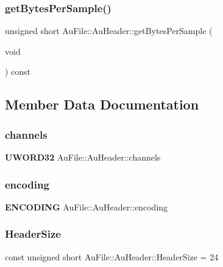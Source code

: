 \subsubsection{get\+Bytes\+Per\+Sample()}
{\footnotesize\ttfamily unsigned short Au\+File\+::\+Au\+Header\+::get\+Bytes\+Per\+Sample (\begin{DoxyParamCaption}\item[{void}]{ }\end{DoxyParamCaption}) const}



\subsection{Member Data Documentation}
\mbox{\label{classAuFile_1_1AuHeader_a6b283f9b7d02ef0def4edc67f359d646}} 
\subsubsection{channels}
{\footnotesize\ttfamily \textbf{ U\+W\+O\+R\+D32} Au\+File\+::\+Au\+Header\+::channels}

\mbox{\label{classAuFile_1_1AuHeader_a463aaa38af82f54346c97f853e4e7240}} 
\subsubsection{encoding}
{\footnotesize\ttfamily \textbf{ E\+N\+C\+O\+D\+I\+NG} Au\+File\+::\+Au\+Header\+::encoding}

\mbox{\label{classAuFile_1_1AuHeader_aaf8f81ce6c30d831ec20706cbc3a075c}} 
\subsubsection{Header\+Size}
{\footnotesize\ttfamily const unsigned short Au\+File\+::\+Au\+Header\+::\+Header\+Size = 24\hspace{0.3cm}{\ttfamily [static]}}

\mbox{\label{classAuFile_1_1AuHeader_a64c598b07cf8a332717f8164439d4590}} 
